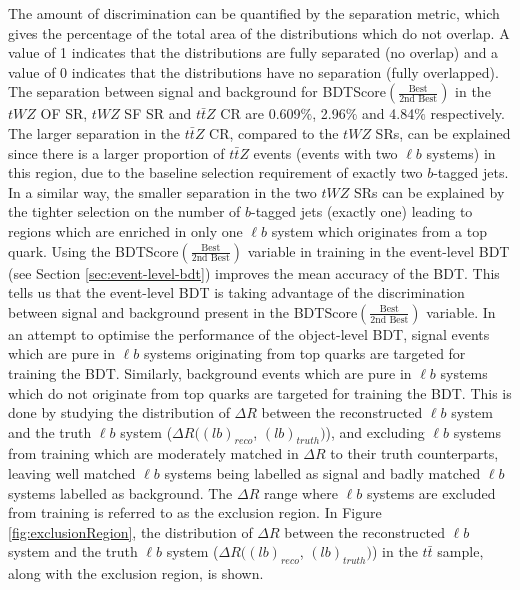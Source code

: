 \begin{figure}[h!]
\end{figure}The amount of discrimination can be quantified by the separation metric, which gives the percentage of the total area of the distributions which do not overlap. A value of 1 indicates that the distributions are fully separated (no overlap) and a value of 0 indicates that the distributions have no separation (fully overlapped). The separation between signal and background for BDTScore$(\frac{\text{Best}}{\text{2nd Best}})$ in the $tWZ$ OF SR, $tWZ$ SF SR and $t\bar{t}Z$ CR are 0.609$\%$, 2.96$\%$ and 4.84$\%$ respectively. The larger separation in the $t\bar{t}Z$ CR, compared to the $tWZ$ SRs, can be explained since there is a larger proportion of $t\bar{t}Z$ events (events with two $\ell b$ systems) in this region, due to the baseline selection requirement of exactly two $b$-tagged jets. In a similar way, the smaller separation in the two $tWZ$ SRs can be explained by the tighter selection on the number of $b$-tagged jets (exactly one) leading to regions which are enriched in only one $\ell b$ system which originates from a top quark. Using the BDTScore$(\frac{\text{Best}}{\text{2nd Best}})$ variable in training in the event-level BDT (see Section \ref{sec:event-level-bdt}) improves the mean accuracy of the BDT. This tells us that the event-level BDT is taking advantage of the discrimination between signal and background present in the BDTScore$(\frac{\text{Best}}{\text{2nd Best}})$ variable. In an attempt to optimise the performance of the object-level BDT, signal events which are pure in $\ell b$ systems originating from top quarks are targeted for training the BDT. Similarly, background events which are pure in $\ell b$ systems which do not originate from top quarks are targeted for training the BDT. This is done by studying the distribution of $\Delta R$ between the reconstructed $\ell b$ system and the truth $\ell b$ system ($\Delta R((lb)_{reco}$, $(lb)_{truth})$), and excluding $\ell b$ systems from training which are moderately matched in $\Delta R$ to their truth counterparts, leaving well matched $\ell b$ systems being labelled as signal and badly matched $\ell b$ systems labelled as background. The $\Delta R$ range where $\ell b$ systems are excluded from training is referred to as the exclusion region. In Figure \ref{fig:exclusionRegion}, the distribution of $\Delta R$ between the reconstructed $\ell b$ system and the truth $\ell b$ system ($\Delta R((lb)_{reco}$, $(lb)_{truth})$) in the $t\bar{t}$ sample, along with the exclusion region, is shown.
